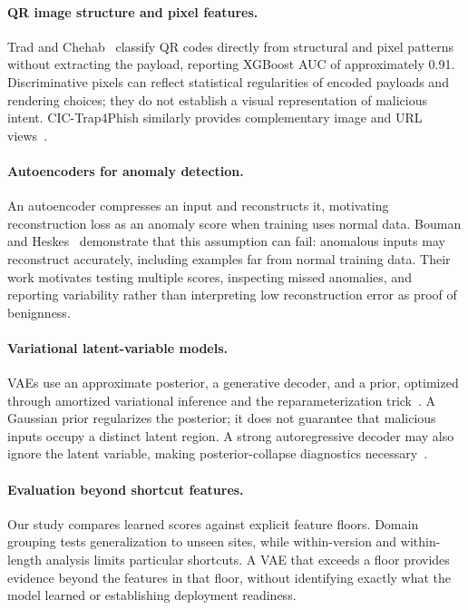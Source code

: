 \documentclass{article}
\begin{document}
\paragraph{QR image structure and pixel features.}
Trad and Chehab~\citep{trad} classify QR codes directly from structural and pixel patterns without extracting the payload, reporting XGBoost AUC of approximately 0.91.
Discriminative pixels can reflect statistical regularities of encoded payloads and rendering choices; they do not establish a visual representation of malicious intent.
CIC-Trap4Phish similarly provides complementary image and URL views~\citep{nejati,cic}.

\paragraph{Autoencoders for anomaly detection.}
An autoencoder compresses an input and reconstructs it, motivating reconstruction loss as an anomaly score when training uses normal data.
Bouman and Heskes~\citep{bouman} demonstrate that this assumption can fail: anomalous inputs may reconstruct accurately, including examples far from normal training data.
Their work motivates testing multiple scores, inspecting missed anomalies, and reporting variability rather than interpreting low reconstruction error as proof of benignness.

\paragraph{Variational latent-variable models.}
VAEs use an approximate posterior, a generative decoder, and a prior, optimized through amortized variational inference and the reparameterization trick~\citep{kingma,rezende}.
A Gaussian prior regularizes the posterior; it does not guarantee that malicious inputs occupy a distinct latent region.
A strong autoregressive decoder may also ignore the latent variable, making posterior-collapse diagnostics necessary~\citep{bowman,higgins}.

\paragraph{Evaluation beyond shortcut features.}
Our study compares learned scores against explicit feature floors.
Domain grouping tests generalization to unseen sites, while within-version and within-length analysis limits particular shortcuts.
A VAE that exceeds a floor provides evidence beyond the features in that floor, without identifying exactly what the model learned or establishing deployment readiness.
\end{document}
